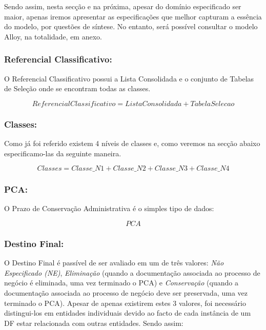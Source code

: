 \documentclass[tikz,runningheads,a4paper]{llncs}
\begin{document}
Sendo assim, nesta secção e na próxima, apesar do domínio especificado ser maior, apenas iremos apresentar as especificações que melhor capturam a essência do modelo, por questões de síntese. No entanto, será possível consultar o modelo Alloy, na totalidade, em anexo.

\subsubsection{Referencial Classificativo:}

O Referencial Classificativo possui a Lista Consolidada e o conjunto de Tabelas de Seleção onde se encontram todas as classes.

\begin{equation*}
    ReferencialClassificativo = ListaConsolidada + TabelaSelecao
\end{equation*}

\subsubsection{Classes:}

Como já foi referido existem 4 níveis de classes e, como veremos na secção abaixo especificamo-las da seguinte maneira.

\begin{equation*}
    Classes = Classe\_N1 + Classe\_N2 + Classe\_N3 + Classe\_N4
\end{equation*}

\subsubsection{PCA:}

O Prazo de Conservação Administrativa é o simples tipo de dados:

\begin{equation*}
    PCA
\end{equation*}

\subsubsection{Destino Final:}

O Destino Final é passível de ser avaliado em um de três valores: \textit{Não Especificado (NE)}, \textit{Eliminação} (quando a documentação associada ao processo de negócio é eliminada, uma vez terminado o PCA) e \textit{Conservação} (quando a documentação associada ao processo de negócio deve ser preservada, uma vez terminado o PCA). Apesar de apenas existirem estes 3 valores, foi necessário distingui-los em entidades individuais devido ao facto de cada instância de um DF estar relacionada com outras entidades. Sendo assim:
\end{document}

